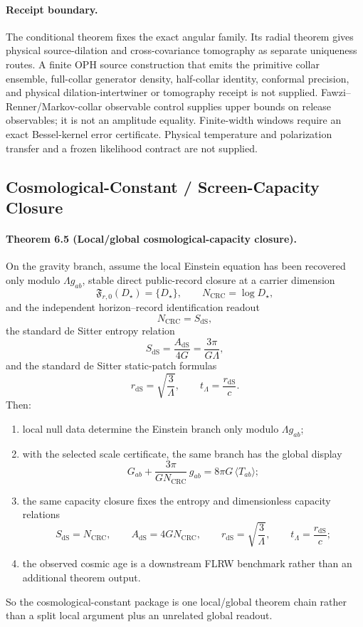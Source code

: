 \paragraph{\textbf{Receipt boundary.}}
The conditional theorem fixes the exact angular family. Its radial theorem gives physical
source-dilation and cross-covariance tomography as separate uniqueness routes. A finite OPH source
construction that emits the primitive collar ensemble, full-collar generator density, half-collar identity,
conformal precision, and physical dilation-intertwiner or tomography receipt is not supplied.
Fawzi--Renner/Markov-collar observable control supplies
upper bounds on release observables; it is not an amplitude equality. Finite-width windows require
an exact Bessel-kernel error certificate. Physical temperature and
polarization transfer and a frozen likelihood contract are not supplied.

\subsection{Cosmological-Constant / Screen-Capacity Closure}

\paragraph{\textbf{Theorem 6.5 (Local/global cosmological-capacity closure).}}
On the gravity branch, assume the local Einstein equation has been recovered only modulo
\(\Lambda g_{ab}\), stable direct public-record closure at a carrier dimension
\[
\mathfrak F_{r,0}(D_\star)=\{D_\star\},
\qquad N_{\mathrm{CRC}}=\log D_\star,
\]
and the independent horizon--record identification readout
\[
N_{\mathrm{CRC}}=S_{\mathrm{dS}},
\]
\noindent the standard de Sitter entropy relation
\[
S_{\mathrm{dS}}=\frac{A_{\mathrm{dS}}}{4G}=\frac{3\pi}{G\Lambda},
\]
and the standard de Sitter static-patch formulas
\[
r_{\mathrm{dS}}=\sqrt{\frac{3}{\Lambda}},
\qquad
t_\Lambda=\frac{r_{\mathrm{dS}}}{c}.
\]
Then:
\begin{enumerate}[leftmargin=2em]
\item local null data determine the Einstein branch only modulo \(\Lambda g_{ab}\);
\item with the selected scale certificate, the same branch has the global display
\[
G_{ab}+\frac{3\pi}{G N_{\mathrm{CRC}}}\,g_{ab}=8\pi G\,\langle T_{ab}\rangle;
\]
\item the same capacity closure fixes the entropy and dimensionless capacity relations
\[
S_{\mathrm{dS}}=N_{\mathrm{CRC}},
\qquad
A_{\mathrm{dS}}=4G N_{\mathrm{CRC}},
\qquad
r_{\mathrm{dS}}=\sqrt{\frac{3}{\Lambda}},
\qquad
t_\Lambda=\frac{r_{\mathrm{dS}}}{c};
\]
\item the observed cosmic age is a downstream FLRW benchmark rather than an additional theorem output.
\end{enumerate}
So the cosmological-constant package is one local/global theorem chain rather than a split local
argument plus an unrelated global readout.


